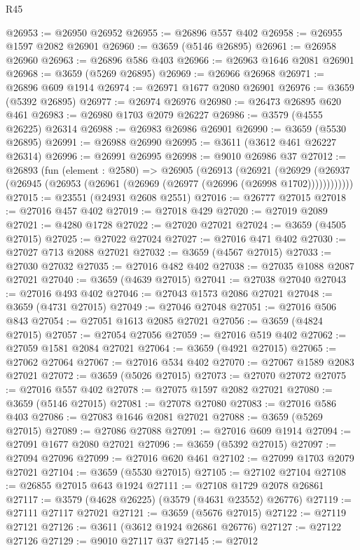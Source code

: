 \begin{lexlean}{R45}
\begin{coremodule}
@26953 := @26950 @26952
@26955 := @26896 @557 @402
@26958 := @26955 @1597 @2082 @26901
@26960 := @3659 (@5146 @26895)
@26961 := @26958 @26960
@26963 := @26896 @586 @403
@26966 := @26963 @1646 @2081 @26901
@26968 := @3659 (@5269 @26895)
@26969 := @26966 @26968
@26971 := @26896 @609 @1914
@26974 := @26971 @1677 @2080 @26901
@26976 := @3659 (@5392 @26895)
@26977 := @26974 @26976
@26980 := @26473 @26895 @620 @461
@26983 := @26980 @1703 @2079 @26227
@26986 := @3579 (@4555 @26225) @26314
@26988 := @26983 @26986 @26901
@26990 := @3659 (@5530 @26895)
@26991 := @26988 @26990
@26995 := @3611 (@3612 @461 @26227 @26314)
@26996 := @26991 @26995
@26998 := @9010 @26986 @37
@27012 := @26893
    (fun (element : @2580) =>
    @26905
      (@26913
        (@26921
          (@26929 (@26937 (@26945 (@26953 (@26961 (@26969 (@26977 (@26996 (@26998 @1702))))))))))))
@27015 := @23551 (@24931 @2608 @2551)
@27016 := @26777 @27015
@27018 := @27016 @457 @402
@27019 := @27018 @429
@27020 := @27019 @2089
@27021 := @4280 @1728
@27022 := @27020 @27021
@27024 := @3659 (@4505 @27015)
@27025 := @27022 @27024
@27027 := @27016 @471 @402
@27030 := @27027 @713 @2088 @27021
@27032 := @3659 (@4567 @27015)
@27033 := @27030 @27032
@27035 := @27016 @482 @402
@27038 := @27035 @1088 @2087 @27021
@27040 := @3659 (@4639 @27015)
@27041 := @27038 @27040
@27043 := @27016 @493 @402
@27046 := @27043 @1573 @2086 @27021
@27048 := @3659 (@4731 @27015)
@27049 := @27046 @27048
@27051 := @27016 @506 @843
@27054 := @27051 @1613 @2085 @27021
@27056 := @3659 (@4824 @27015)
@27057 := @27054 @27056
@27059 := @27016 @519 @402
@27062 := @27059 @1581 @2084 @27021
@27064 := @3659 (@4921 @27015)
@27065 := @27062 @27064
@27067 := @27016 @534 @402
@27070 := @27067 @1589 @2083 @27021
@27072 := @3659 (@5026 @27015)
@27073 := @27070 @27072
@27075 := @27016 @557 @402
@27078 := @27075 @1597 @2082 @27021
@27080 := @3659 (@5146 @27015)
@27081 := @27078 @27080
@27083 := @27016 @586 @403
@27086 := @27083 @1646 @2081 @27021
@27088 := @3659 (@5269 @27015)
@27089 := @27086 @27088
@27091 := @27016 @609 @1914
@27094 := @27091 @1677 @2080 @27021
@27096 := @3659 (@5392 @27015)
@27097 := @27094 @27096
@27099 := @27016 @620 @461
@27102 := @27099 @1703 @2079 @27021
@27104 := @3659 (@5530 @27015)
@27105 := @27102 @27104
@27108 := @26855 @27015 @643 @1924
@27111 := @27108 @1729 @2078 @26861
@27117 := @3579 (@4628 @26225) (@3579 (@4631 @23552) @26776)
@27119 := @27111 @27117 @27021
@27121 := @3659 (@5676 @27015)
@27122 := @27119 @27121
@27126 := @3611 (@3612 @1924 @26861 @26776)
@27127 := @27122 @27126
@27129 := @9010 @27117 @37
@27145 := @27012

\end{coremodule}
\end{lexlean}
